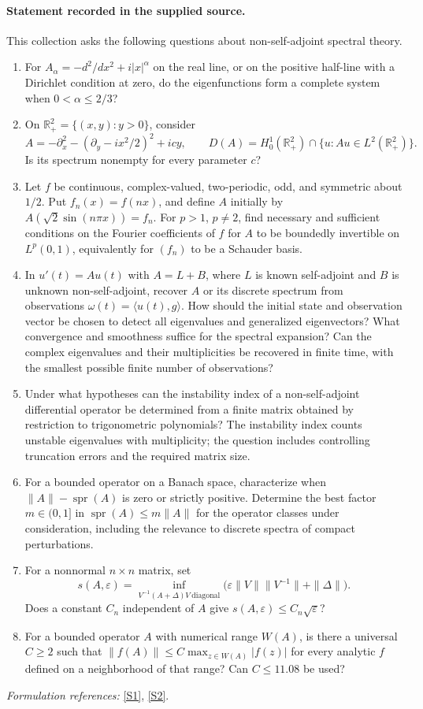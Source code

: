 \documentclass[11pt]{article}
\newcommand{\sref}[2]{\hyperlink{source:#1:#2}{[S#2]}}
\begin{document}
\paragraph{Statement recorded in the supplied source.}
This collection asks the following questions about non-self-adjoint spectral theory.
\begin{enumerate}
\item For $A_\alpha=-d^2/dx^2+i|x|^\alpha$ on the real line, or on the positive half-line with a Dirichlet condition at zero, do the eigenfunctions form a complete system when $0<\alpha\leq2/3$?
\item On $\mathbb R^2_+=\{(x,y):y>0\}$, consider
\[A=-\partial_x^2-(\partial_y-ix^2/2)^2+icy,\qquad D(A)=H^1_0(\mathbb R^2_+)\cap\{u:Au\in L^2(\mathbb R^2_+)\}.\]
Is its spectrum nonempty for every parameter $c$?
\item Let $f$ be continuous, complex-valued, two-periodic, odd, and symmetric about $1/2$. Put $f_n(x)=f(nx)$, and define $A$ initially by $A(\sqrt2\sin(n\pi x))=f_n$. For $p>1$, $p\neq2$, find necessary and sufficient conditions on the Fourier coefficients of $f$ for $A$ to be boundedly invertible on $L^p(0,1)$, equivalently for $(f_n)$ to be a Schauder basis.
\item In $u'(t)=Au(t)$ with $A=L+B$, where $L$ is known self-adjoint and $B$ is unknown non-self-adjoint, recover $A$ or its discrete spectrum from observations $\omega(t)=\langle u(t),g\rangle$. How should the initial state and observation vector be chosen to detect all eigenvalues and generalized eigenvectors? What convergence and smoothness suffice for the spectral expansion? Can the complex eigenvalues and their multiplicities be recovered in finite time, with the smallest possible finite number of observations?
\item Under what hypotheses can the instability index of a non-self-adjoint differential operator be determined from a finite matrix obtained by restriction to trigonometric polynomials? The instability index counts unstable eigenvalues with multiplicity; the question includes controlling truncation errors and the required matrix size.
\item For a bounded operator on a Banach space, characterize when $\|A\|-\operatorname{spr}(A)$ is zero or strictly positive. Determine the best factor $m\in(0,1]$ in $\operatorname{spr}(A)\leq m\|A\|$ for the operator classes under consideration, including the relevance to discrete spectra of compact perturbations.
\item For a nonnormal $n\times n$ matrix, set
\[s(A,\varepsilon)=\inf_{V^{-1}(A+\Delta)V\ \mathrm{diagonal}}\bigl(\varepsilon\|V\|\|V^{-1}\|+\|\Delta\|\bigr).\]
Does a constant $C_n$ independent of $A$ give $s(A,\varepsilon)\leq C_n\sqrt\varepsilon$?
\item For a bounded operator $A$ with numerical range $W(A)$, is there a universal $C\geq2$ such that $\|f(A)\|\leq C\max_{z\in W(A)}|f(z)|$ for every analytic $f$ defined on a neighborhood of that range? Can $C\leq11.08$ be used?
\end{enumerate}
\par\smallskip\textit{Formulation references:} \sref{statement}{1}, \sref{statement}{2}.
\end{document}
